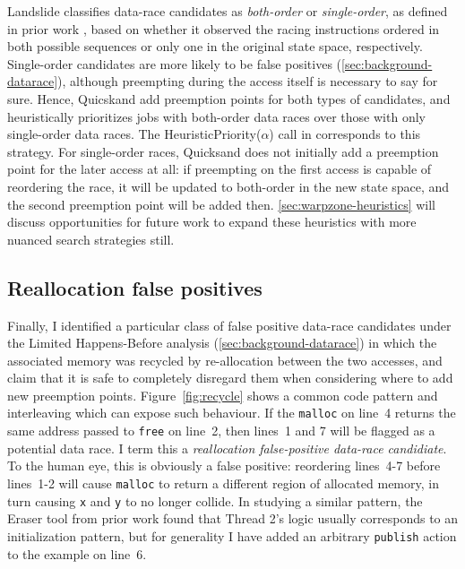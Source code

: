 Landslide classifies data-race candidates as {\em both-order} or {\em single-order},
as defined in prior work \cite{portend},
based on whether it observed the racing instructions ordered in both possible sequences or only one
in the original state space, respectively.
Single-order candidates are more likely to be false positives (\cref{sec:background-datarace}),
although preempting during the access itself is necessary to say for sure.
Hence, Quicskand add preemption points for both types of candidates,
and heuristically prioritizes jobs with both-order data races
over those with only single-order data races.
The HeuristicPriority($\alpha$) call in  corresponds to this strategy.
For single-order races, Quicksand does not initially add a preemption point for the later access at all:
if preempting on the first access is capable of reordering the race,
it will be updated to both-order in the new state space, and the second preemption point will be added then.
\cref{sec:warpzone-heuristics} will discuss opportunities for future work to expand
these heuristics with more nuanced search strategies still.


\subsection{Reallocation false positives}
\label{sec:quicksand-id-realloc}

Finally, I identified a particular class of false positive data-race candidates
under the Limited Happens-Before analysis (\cref{sec:background-datarace})
in which the associated memory was recycled by re-allocation between the two accesses,
and claim that it is safe to completely disregard them when considering where to add new preemption points.
Figure~\ref{fig:recycle} shows a common code pattern and interleaving which can expose such behaviour.
If the {\tt malloc} on line~4 returns the same address passed to {\tt free} on line~2,
then lines~1 and 7 will be flagged as a potential data race.
I term this a {\em reallocation false-positive data-race candidiate}.
To the human eye, this is obviously a false positive:
reordering lines~4-7 before lines~1-2 will cause {\tt malloc} to return a different region of allocated memory,
in turn causing {\tt x} and {\tt y} to no longer collide.
In studying a similar pattern, the Eraser tool from prior work \cite{eraser}
found that Thread 2's logic usually corresponds to an initialization pattern,
but for generality I have added an arbitrary {\tt publish} action to the example on line~6.

